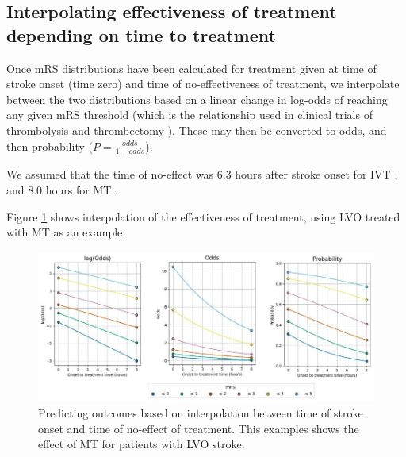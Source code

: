 \subsection{Interpolating effectiveness of treatment depending on time to treatment}

Once mRS distributions have been calculated for treatment given at time of stroke onset (time zero) and time of no-effectiveness of treatment, we interpolate between the two distributions based on a linear change in log-odds of reaching any given mRS threshold (which is the relationship used in clinical trials of thrombolysis and thrombectomy \cite{emberson_effect_2014, fransen_time_2016}). These may then be converted to odds, and then probability ($P = \frac{odds}{1 + odds}$).

We assumed that the time of no-effect was 6.3 hours after stroke onset for IVT \cite{emberson_effect_2014}, and 8.0 hours for MT \cite{fransen_time_2016}.

Figure \ref{fig:interpolation} shows interpolation of the effectiveness of treatment, using LVO treated with MT as an example.

\begin{figure}[h!]
    \centering
    \includegraphics[width=1.0\linewidth]{images_modelling/log_odds_to_probs.jpg}
    \caption{Predicting outcomes based on interpolation between time of stroke onset and time of no-effect of treatment. This examples shows the effect of MT for patients with LVO stroke.}
    \label{fig:interpolation}
\end{figure}



